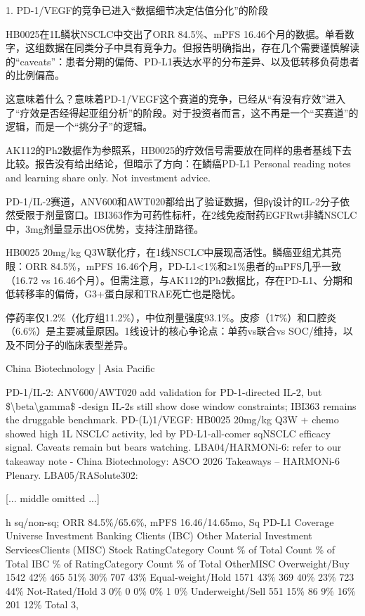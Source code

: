 \documentclass[11pt]{ctexart}
\begin{document}
1. PD-1/VEGF的竞争已进入“数据细节决定估值分化”的阶段

HB0025在1L鳞状NSCLC中交出了ORR 84.5\%、mPFS 16.46个月的数据。单看数字，这组数据在同类分子中具有竞争力。但报告明确指出，存在几个需要谨慎解读的“caveats”：患者分期的偏倚、PD-L1表达水平的分布差异、以及低转移负荷患者的比例偏高。

这意味着什么？意味着PD-1/VEGF这个赛道的竞争，已经从“有没有疗效”进入了“疗效是否经得起亚组分析”的阶段。对于投资者而言，这不再是一个“买赛道”的逻辑，而是一个“挑分子”的逻辑。

AK112的Ph2数据作为参照系，HB0025的疗效信号需要放在同样的患者基线下去比较。报告没有给出结论，但暗示了方向：在鳞癌PD-L1 Personal reading notes and learning share only. Not investment advice.

PD-1/IL-2赛道，ANV600和AWT020都给出了验证数据，但βγ设计的IL-2分子依然受限于剂量窗口。IBI363作为可药性标杆，在2线免疫耐药EGFRwt非鳞NSCLC中，3mg剂量显示出OS优势，支持注册路径。

HB0025 20mg/kg Q3W联化疗，在1线NSCLC中展现高活性。鳞癌亚组尤其亮眼：ORR 84.5\%，mPFS 16.46个月，PD-L1<1\%和≥1\%患者的mPFS几乎一致（16.72 vs 16.46个月）。但需注意，与AK112的Ph2数据比，存在PD-L1、分期和低转移率的偏倚，G3+蛋白尿和TRAE死亡也是隐忧。

停药率仅1.2\%（化疗组11.2\%），中位剂量强度93.1\%。皮疹（17\%）和口腔炎（6.6\%）是主要减量原因。1线设计的核心争论点：单药vs联合vs SOC/维持，以及不同分子的临床表型差异。

China Biotechnology | Asia Pacific

PD-1/IL-2: ANV600/AWT020 add validation for PD-1-directed IL-2, but \$\textbackslash{}beta\textbackslash{}gamma\$ -design IL-2s still show dose window constraints; IBI363 remains the druggable benchmark. PD-(L)1/VEGF: HB0025 20mg/kg Q3W + chemo showed high 1L NSCLC activity, led by PD-L1-all-comer sqNSCLC efficacy signal. Caveats remain but bears watching. LBA04/HARMONi-6: refer to our takeaway note - China Biotechnology: ASCO 2026 Takeaways – HARMONi-6 Plenary. LBA05/RASolute302: 

[... middle omitted ...]

h sq/non-sq; ORR 84.5\%/65.6\%, mPFS 16.46/14.65mo, Sq PD-L1 Coverage Universe Investment Banking Clients (IBC) Other Material Investment ServicesClients (MISC) Stock RatingCategory Count \% of Total Count \% of Total IBC \% of RatingCategory Count \% of Total OtherMISC Overweight/Buy 1542 42\% 465 51\% 30\% 707 43\% Equal-weight/Hold 1571 43\% 369 40\% 23\% 723 44\% Not-Rated/Hold 3 0\% 0 0\% 0\% 1 0\% Underweight/Sell 551 15\% 86 9\% 16\% 201 12\% Total 3,
\end{document}
